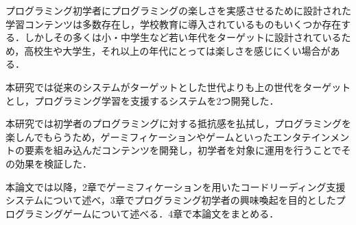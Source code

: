プログラミング初学者にプログラミングの楽しさを実感させるために設計された学習コンテンツは多数存在し，学校教育に導入されているものもいくつか存在する．しかしその多くは小・中学生など若い年代をターゲットに設計されているため，高校生や大学生，それ以上の年代にとっては楽しさを感じにくい場合がある．

本研究では従来のシステムがターゲットとした世代よりも上の世代をターゲットとし，プログラミング学習を支援するシステムを2つ開発した．

本研究では初学者のプログラミングに対する抵抗感を払拭し，プログラミングを楽しんでもらうため，ゲーミフィケーションやゲームといったエンタテインメントの要素を組み込んだコンテンツを開発し，初学者を対象に運用を行うことでその効果を検証した．

本論文では以降，2章でゲーミフィケーションを用いたコードリーディング支援システムについて述べ，3章でプログラミング初学者の興味喚起を目的としたプログラミングゲームについて述べる．4章で本論文をまとめる．